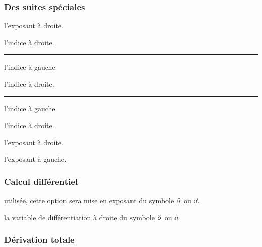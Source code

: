 \documentclass[12pt,a4paper]{article}
\theoremstyle{definition}
\newcommand\separation{
	\medskip
	\hfill\rule{0.5\textwidth}{0.75pt}\hfill
	\medskip
}
\newcommand\extraspace{
	\vspace{0.25em}
}
\begin{document}


\subsubsection{Des suites spéciales}


 l'exposant à droite.

 l'indice à droite.


\separation



 l'indice à gauche.

 l'indice à droite.


\separation



 l'indice à gauche.

 l'indice à droite.

 l'exposant à droite.

 l'exposant à gauche.
\subsubsection{Calcul différentiel}



\IDoption{} utilisée, cette option sera mise en exposant du symbole $\pp{}$ ou $\dd{}$.

\IDarg{} la variable de différentiation à droite du symbole $\pp{}$ ou $\dd{}$.





\subsubsection{Dérivation totale}



\extraspace



\extraspace


\end{document}
